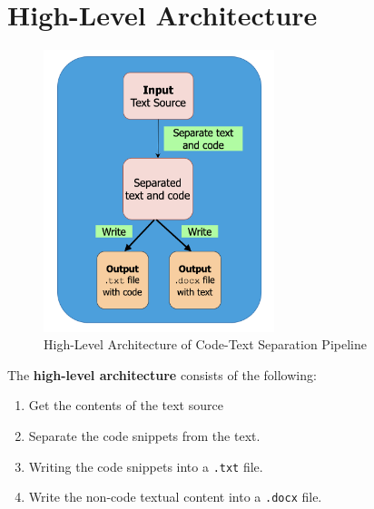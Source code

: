 \documentclass[12pt]{scrreprt}
\begin{document}



\section{High-Level Architecture}

\begin{figure}[h]
    \centering
    \includegraphics[width=0.6\textwidth]{figures/NB-high-arch.png}
    \caption{High-Level Architecture of Code-Text Separation Pipeline}
    \label{fig:high-level-arch}
\end{figure}


The \textbf{high-level architecture} consists of the following:
\begin{enumerate}
    \item Get the contents of the text source
    \item Separate the code snippets from the text.
    \item Writing the code snippets into a \texttt{.txt} file.
    \item Write the non-code textual content into a \texttt{.docx} file.
\end{enumerate}
\end{document}
